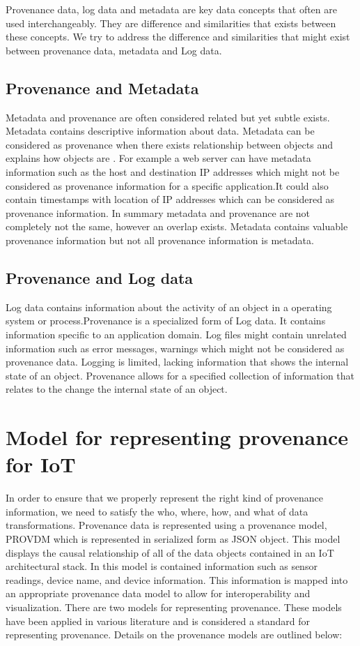 Provenance data, log data and metadata are key data concepts that often are used interchangeably. They are difference and similarities that exists between these concepts. We try to address the difference and similarities that might exist between provenance data, metadata and Log data.

\subsection{Provenance and Metadata}
Metadata and provenance are often considered related but yet subtle exists. Metadata contains descriptive information about data. Metadata can be considered as provenance when there exists relationship between objects and explains how objects are . For example a web server can have metadata information such as the host and destination IP addresses which might not be considered as provenance information for a specific application.It could also contain timestamps with location of IP addresses which can be considered as provenance information. In summary metadata and provenance are not completely not the same, however an overlap exists. Metadata contains valuable  provenance information but not all provenance information is metadata. 


\subsection{Provenance and Log data}
Log data contains information about the activity of an object in a operating system or process.Provenance is a specialized form of Log data. It contains information specific to an application domain. Log files might contain unrelated information such as error messages, warnings which might not be considered as provenance data. Logging is limited, lacking information that shows the internal state of an object. Provenance allows for a specified collection of information that relates to the change the internal state of an object.

\section{Model for representing provenance for IoT}

In order to ensure that we properly represent the right kind of provenance information, we need to satisfy the who, where, how, and what of data transformations. Provenance data is represented using a provenance model, PROV\-DM which is represented in serialized form as JSON object. This model displays the causal relationship of all of the data objects contained in an IoT architectural stack. In this model is contained information such as sensor readings, device name, and device information. This information is mapped into an appropriate provenance data model  to allow for interoperability and visualization. There are two models for representing provenance. These models have been applied in various literature and is considered a standard for representing provenance. Details on the provenance models are outlined below:

